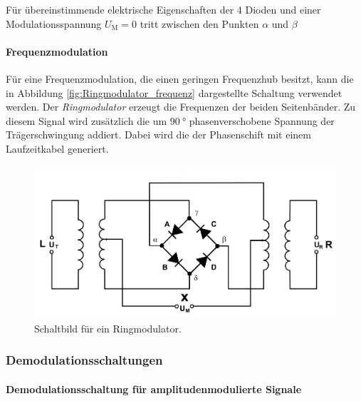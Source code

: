 Für übereinstimmende elektrische Eigenschaften
der 4 Dioden und einer Modulationsspannung $U_{\text{M}}=0$
tritt zwischen den Punkten $\alpha$ und $\beta$






\paragraph{Frequenzmodulation}
Für eine Frequenzmodulation, die einen geringen Frequenzhub besitzt,
kann die in Abbildung \ref{fig:Ringmodulator_frequenz} dargestellte
Schaltung verwendet werden.
Der \textit{Ringmodulator} erzeugt die Frequenzen der beiden Seitenbänder.
Zu diesem Signal wird zusätzlich die um $\SI{90}{\degree}$ phasenverschobene
Spannung der Trägerschwingung addiert. Dabei wird die der Phasenschift
mit einem Laufzeitkabel generiert.

\begin{figure}
  \centering
  \includegraphics{figures/Ringmodulator.PNG}
  \caption{Schaltbild für ein Ringmodulator.}
  \label{fig:Ringmodulator}
\end{figure}

\subsubsection{Demodulationsschaltungen}
\label{subsubsec:demodulationschaltungen}
\paragraph{Demodulationsschaltung für amplitudenmodulierte Signale}

